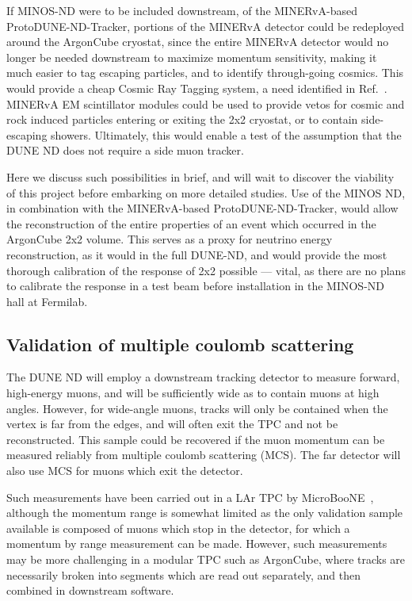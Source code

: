 If MINOS-ND were to be included downstream, of the MINERvA-based ProtoDUNE-ND-Tracker, portions of the MINERvA detector could be redeployed around the ArgonCube cryostat, since the entire MINERvA detector would no longer be needed downstream to maximize momentum sensitivity, making it much easier to tag escaping particles, and to identify through-going cosmics. This would provide a cheap Cosmic Ray Tagging system, a need identified in Ref.~\cite{2x2@FNAL}. MINERvA EM scintillator modules could be used to provide vetos for cosmic and rock induced particles entering or exiting the 2x2 cryostat, or to contain side-escaping showers. Ultimately, this would enable a test of the assumption that the DUNE ND does not require a side muon tracker.

Here we discuss such possibilities in brief, and will wait to discover the viability of this project before embarking on more detailed studies. Use of the MINOS ND, in combination with the MINERvA-based ProtoDUNE-ND-Tracker, would allow the reconstruction of the entire properties of an event which occurred in the ArgonCube 2x2 volume. This serves as a proxy for neutrino energy reconstruction, as it would in the full DUNE-ND, and would provide the most thorough calibration of the response of 2x2 possible --- vital, as there are no plans to calibrate the response in a test beam before installation in the MINOS-ND hall at Fermilab.

\subsection{Validation of multiple coulomb scattering}
The DUNE ND will employ a downstream tracking detector to measure forward, high-energy muons, and will be sufficiently wide as to contain muons at high angles.  However, for wide-angle muons, tracks will only be contained when the vertex is far from the edges, and will often exit the TPC and not be reconstructed.  This sample could be recovered if the muon momentum can be measured reliably from multiple coulomb scattering (MCS). The far detector will also use MCS for muons which exit the detector.

Such measurements have been carried out in a LAr TPC by MicroBooNE~\cite{Abratenko:2017nki}, although the momentum range is somewhat limited as the only validation sample available is composed of muons which stop in the detector, for which a momentum by range measurement can be made. However, such measurements may be more challenging in a modular TPC such as ArgonCube, where tracks are necessarily broken into segments which are read out separately, and then combined in downstream software.

